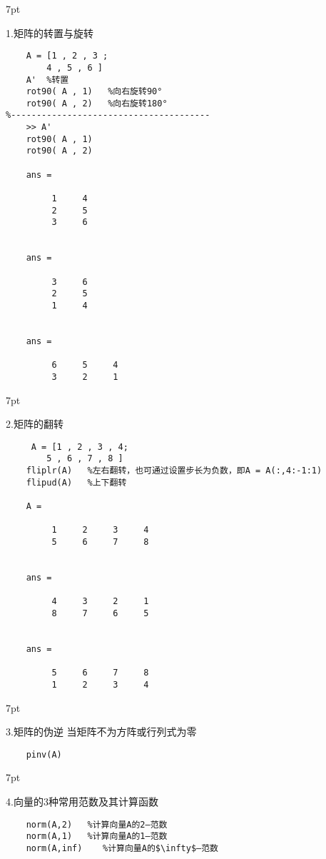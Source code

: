 \documentclass{article} %
\newenvironment{eg}{%
\def\FrameCommand{%
\hspace{1pt}%
{\color{Gray}\vrule width 2pt}%
{\color{egshade}\vrule width 4pt}%
\colorbox{egshade}%
}%
\MakeFramed{\advance\hsize-\width\FrameRestore}%
\noindent\hspace{-4.55pt}%
\begin{adjustwidth}{}{7pt}%
\vspace{2pt}\vspace{2pt}%
\normalfont %
}
{%
\vspace{2pt}\end{adjustwidth}\endMakeFramed%
}
\begin{document}
\begin{eg}
    1.矩阵的转置与旋转
\end{eg}
\begin{lstlisting}
    A = [1 , 2 , 3 ;
        4 , 5 , 6 ]
    A'  %转置
    rot90( A , 1)   %向右旋转90°
    rot90( A , 2)   %向右旋转180°
%---------------------------------------
    >> A'
    rot90( A , 1)
    rot90( A , 2)

    ans =

         1     4
         2     5
         3     6


    ans =

         3     6
         2     5
         1     4


    ans =

         6     5     4
         3     2     1
\end{lstlisting}

\begin{eg}
    2.矩阵的翻转
\end{eg}
\begin{lstlisting}
     A = [1 , 2 , 3 , 4;
        5 , 6 , 7 , 8 ]
    fliplr(A)   %左右翻转，也可通过设置步长为负数，即A = A(:,4:-1:1)
    flipud(A)   %上下翻转

    A =

         1     2     3     4
         5     6     7     8


    ans =

         4     3     2     1
         8     7     6     5


    ans =

         5     6     7     8
         1     2     3     4
\end{lstlisting}

\begin{eg}
    3.矩阵的伪逆
    当矩阵不为方阵或行列式为零
\end{eg}
\begin{lstlisting}
    pinv(A)
\end{lstlisting}

\begin{eg}
    4.向量的3种常用范数及其计算函数
\end{eg}
\begin{lstlisting}
    norm(A,2)   %计算向量A的2—范数
    norm(A,1)   %计算向量A的1—范数
    norm(A,inf)    %计算向量A的$\infty$—范数
\end{lstlisting}
\end{document}
